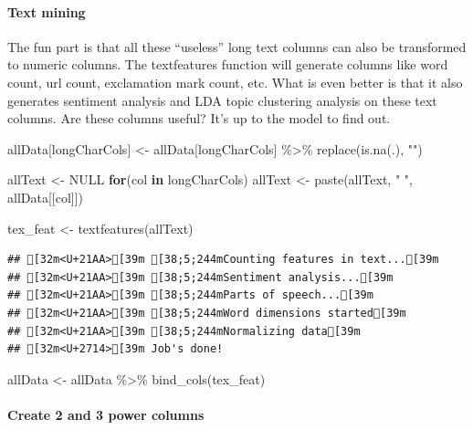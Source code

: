 \documentclass[
]{article}
\newenvironment{Shaded}{\begin{snugshade}}{\end{snugshade}}
\newcommand{\ConstantTok}[1]{\textcolor[rgb]{0.00,0.00,0.00}{#1}}
\newcommand{\ControlFlowTok}[1]{\textcolor[rgb]{0.13,0.29,0.53}{\textbf{#1}}}
\newcommand{\FunctionTok}[1]{\textcolor[rgb]{0.00,0.00,0.00}{#1}}
\newcommand{\NormalTok}[1]{#1}
\newcommand{\OtherTok}[1]{\textcolor[rgb]{0.56,0.35,0.01}{#1}}
\newcommand{\SpecialCharTok}[1]{\textcolor[rgb]{0.00,0.00,0.00}{#1}}
\newcommand{\StringTok}[1]{\textcolor[rgb]{0.31,0.60,0.02}{#1}}
\begin{document}
\hypertarget{text-mining}{%
\paragraph{Text mining}\label{text-mining}}

The fun part is that all these ``useless'' long text columns can also be
transformed to numeric columns. The textfeatures function will generate
columns like word count, url count, exclamation mark count, etc. What is
even better is that it also generates sentiment analysis and LDA topic
clustering analysis on these text columns. Are these columns useful?
It's up to the model to find out.

\begin{Shaded}
\begin{Highlighting}[]
\NormalTok{allData[longCharCols] }\OtherTok{\textless{}{-}}\NormalTok{ allData[longCharCols] }\SpecialCharTok{\%\textgreater{}\%} \FunctionTok{replace}\NormalTok{(}\FunctionTok{is.na}\NormalTok{(.), }\StringTok{""}\NormalTok{)}

\NormalTok{allText }\OtherTok{\textless{}{-}} \ConstantTok{NULL}
\ControlFlowTok{for}\NormalTok{(col }\ControlFlowTok{in}\NormalTok{ longCharCols) allText }\OtherTok{\textless{}{-}} \FunctionTok{paste}\NormalTok{(allText, }\StringTok{" "}\NormalTok{, allData[[col]])}

\NormalTok{tex\_feat }\OtherTok{\textless{}{-}} \FunctionTok{textfeatures}\NormalTok{(allText)}
\end{Highlighting}
\end{Shaded}

\begin{verbatim}
## [32m<U+21AA>[39m [38;5;244mCounting features in text...[39m
## [32m<U+21AA>[39m [38;5;244mSentiment analysis...[39m
## [32m<U+21AA>[39m [38;5;244mParts of speech...[39m
## [32m<U+21AA>[39m [38;5;244mWord dimensions started[39m
## [32m<U+21AA>[39m [38;5;244mNormalizing data[39m
## [32m<U+2714>[39m Job's done!
\end{verbatim}

\begin{Shaded}
\begin{Highlighting}[]
\NormalTok{allData }\OtherTok{\textless{}{-}}\NormalTok{ allData }\SpecialCharTok{\%\textgreater{}\%} \FunctionTok{bind\_cols}\NormalTok{(tex\_feat)}
\end{Highlighting}
\end{Shaded}

\hypertarget{create-2-and-3-power-columns}{%
\paragraph{Create 2 and 3 power
columns}\label{create-2-and-3-power-columns}}
\end{document}
